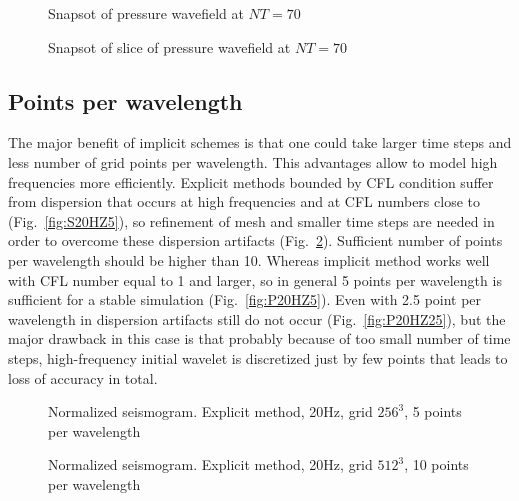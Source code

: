 \documentclass[12pt,a4paper]{report}
\begin{document}
\begin{figure}[h!]
\begin{minipage}[h!]{0.49\textwidth}
  	\caption{Snapsot of pressure wavefield at $NT=70$}
  	\label{fig:step70}
\end{minipage}
\hfill
\begin{minipage}[h!]{0.49\textwidth}
  	\caption{Snapsot of slice of pressure wavefield at $NT=70$}
  	\label{fig:step70s}
\end{minipage}
\end{figure}

\subsection*{Points per wavelength}

The major benefit of implicit schemes is that one could take larger time steps and less number of grid points per wavelength. This advantages allow to model high frequencies more efficiently. 
%
Explicit methods bounded by CFL condition suffer from dispersion that occurs at high frequencies and at CFL numbers close to (Fig.~\ref{fig:S20HZ5}), so refinement of mesh and smaller time  steps are needed in order to overcome these dispersion artifacts (Fig.~\ref{fig:S20HZ10}). Sufficient number of points per wavelength should be higher than 10. Whereas implicit method works well with CFL number equal to 1 and larger, so in general 5 points per wavelength is sufficient for a stable simulation (Fig.~\ref{fig:P20HZ5}). Even with 2.5 point per wavelength in dispersion artifacts still do not occur (Fig.~\ref{fig:P20HZ25}), but the major drawback in this case is that probably because of too small number of time steps, high-frequency initial wavelet is discretized just by few points that leads to loss of accuracy in total.

\begin{figure}[h!]
\begin{minipage}[h!]{0.49\textwidth}
  	\caption{Normalized seismogram. Explicit method, 20Hz, grid $256^3$, 5 points per wavelength}
  	\label{fig:S20HZ5}
\end{minipage}
\hfill
\begin{minipage}[h!]{0.49\textwidth}
  	\caption{Normalized seismogram. Explicit method, 20Hz, grid $512^3$, 10 points per wavelength}
  	\label{fig:S20HZ10}
\end{minipage}
\end{figure}
\end{document}
